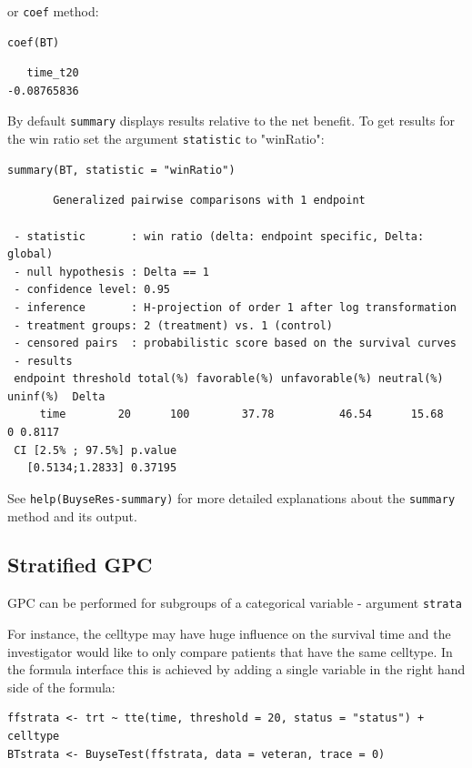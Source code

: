 \documentclass[12pt]{article}
\begin{document}
or \texttt{coef} method:
\lstset{language=r,label= ,caption= ,captionpos=b,numbers=none}
\begin{lstlisting}
coef(BT)
\end{lstlisting}

\begin{verbatim}
   time_t20 
-0.08765836
\end{verbatim}


By default \texttt{summary} displays results relative to the net benefit. To
get results for the win ratio set the argument \texttt{statistic} to
"winRatio":
\lstset{language=r,label= ,caption= ,captionpos=b,numbers=none}
\begin{lstlisting}
summary(BT, statistic = "winRatio")
\end{lstlisting}

\begin{verbatim}
       Generalized pairwise comparisons with 1 endpoint

 - statistic       : win ratio (delta: endpoint specific, Delta: global) 
 - null hypothesis : Delta == 1 
 - confidence level: 0.95 
 - inference       : H-projection of order 1 after log transformation 
 - treatment groups: 2 (treatment) vs. 1 (control) 
 - censored pairs  : probabilistic score based on the survival curves
 - results
 endpoint threshold total(%) favorable(%) unfavorable(%) neutral(%) uninf(%)  Delta
     time        20      100        37.78          46.54      15.68        0 0.8117
 CI [2.5% ; 97.5%] p.value 
   [0.5134;1.2833] 0.37195
\end{verbatim}

See \texttt{help(BuyseRes-summary)} for more detailed explanations about the
\texttt{summary} method and its output. 


\subsection{Stratified GPC}
\label{sec:orgf6ce6e4}

GPC can be performed for subgroups of a categorical variable \hfill -
argument \texttt{strata}

\bigskip

 For instance, the celltype may have huge influence on the survival
time and the investigator would like to only compare patients that
have the same celltype. In the formula interface this is achieved by
adding a single variable in the right hand side of the formula:
\lstset{language=r,label= ,caption= ,captionpos=b,numbers=none}
\begin{lstlisting}
ffstrata <- trt ~ tte(time, threshold = 20, status = "status") + celltype
BTstrata <- BuyseTest(ffstrata, data = veteran, trace = 0)
\end{lstlisting}
\end{document}
